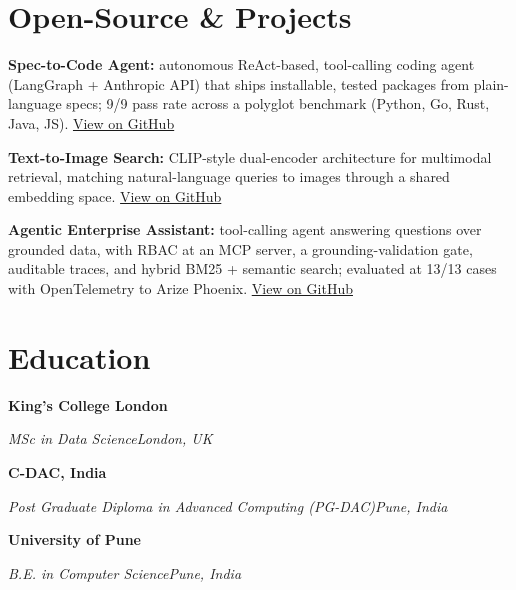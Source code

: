 \documentclass[10pt,a4paper]{article}
\newcommand{\entry}[4]{%
  {\color{company}\bfseries #1}\hfill {\color{muted}#2}\par
  \vspace{1pt}
  {\itshape #3}\hfill {\color{muted}\itshape #4}\par
  \vspace{3pt}%
}
\begin{document}
\section{Open-Source \& Projects}
\begin{tight}
  \item \textbf{Spec-to-Code Agent:} autonomous ReAct-based, tool-calling coding agent (LangGraph + Anthropic API) that ships installable, tested packages from plain-language specs; 9/9 pass rate across a polyglot benchmark (Python, Go, Rust, Java, JS). \href{https://github.com/abhijeetscode/Spec-to-Code-Agent}{View on GitHub}
  \item \textbf{Text-to-Image Search:} CLIP-style dual-encoder architecture for multimodal retrieval, matching natural-language queries to images through a shared embedding space. \href{https://github.com/abhijeetscode/text-to-image-search}{View on GitHub}
  \item \textbf{Agentic Enterprise Assistant:} tool-calling agent answering questions over grounded data, with RBAC at an MCP server, a grounding-validation gate, auditable traces, and hybrid BM25 + semantic search; evaluated at 13/13 cases with OpenTelemetry to Arize Phoenix. \href{https://github.com/abhijeetscode/Agentic-Enterprise-Assistant}{View on GitHub}
\end{tight}

\section{Education}
\entry{King's College London}{}{MSc in Data Science}{London, UK}
\vspace{-3pt}
\entry{C-DAC, India}{}{Post Graduate Diploma in Advanced Computing (PG-DAC)}{Pune, India}
\vspace{-3pt}
\entry{University of Pune}{}{B.E. in Computer Science}{Pune, India}
\end{document}
